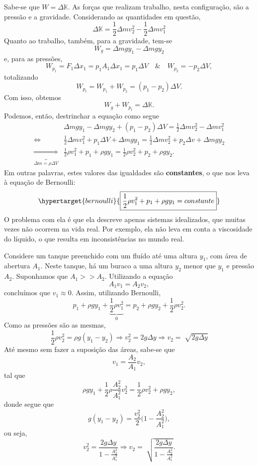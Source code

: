 \documentclass[PhysicsII/physicsII_notes.tex]{subfiles}
\begin{document}
Sabe-se que \(W = \Delta \mathbb{K}\). As forças que realizam trabalho, nesta configuração, são a pressão e a gravidade. Considerando as quantidades em questão,
\[
	\Delta \mathbb{K} = \frac{1}{2}\Delta m v_{2}^{2} - \frac{1}{2}\Delta m v_{1}^{2}
\]
Quanto ao trabalho, também, para a gravidade, tem-se
\[
	W_{g} = \Delta mgy_{1} - \Delta mgy_{2}
\]
e, para as pressões,
\[
	W_{p_{1}} = F_{1}\Delta x_{1} = p_{1}A_{1}\Delta x_{1} = p_{1}\Delta V\quad\&\quad W_{p_{2}} = -p_{2}\Delta V,
\]
totalizando
\[
	W_{p_{t}} = W_{p_{1}} + W_{p_{2}} = (p_{1}-p_{2})\Delta V.
\]
Com isso, obtemos
\[
	W_{g}+W_{p_{t}} = \Delta \mathbb{K}.
\]
Podemos, então, destrinchar a equação como segue
\begin{align*}
	                                                      & \Delta mgy_{1}-\Delta mgy_{2} + (p_{1}-p_{2})\Delta V = \frac{1}{2}\Delta mv_{2}^{2}-\Delta mv_{1}^{2}                        \\
	\Longleftrightarrow\quad                              & \frac{1}{2}\Delta mv_{1}^{2} + p_{1}\Delta V + \Delta mgy_{1} = \frac{1}{2}\Delta mv_{2}^{2} + p_{2}\Delta v + \Delta mgy_{2} \\
	\underbrace{\Longrightarrow}_{\Delta m=\rho \Delta V} & \frac{1}{2}\rho v_{1}^{2} + p_{1} + \rho gy_{1} = \frac{1}{2}\rho v_{2}^{2} + p_{2} + \rho gy_{2}.
\end{align*}
Em outras palavras, estes valores das igualdades são \textbf{constantes}, o que nos leva à equação de Bernoulli:
\[
	\hypertarget{bernoulli}{\boxed{\frac{1}{2}\rho v_{1}^{2}+p_{1}+\rho gy_{1}=constante}}
\]
O problema com ela é que ela descreve apenas sistemas idealizados, que muitas vezes não ocorrem na vida real. Por exemplo,
ela não leva em conta a viscosidade do líquido, o que resulta em inconsistências no mundo real.
\begin{example}
	Considere um tanque preenchido com um fluído até uma altura \(y_{1}\), com área de abertura \(A_{1}\). Neste tanque, há um buraco
	a uma altura \(y_{2}\) menor que \(y_{1}\) e pressão \(A_{2}\). Suponhamos que \(A_{1}>> A_{2}\). Utilizando a equação
	\[
		A_{1}v_{1} = A_{2}v_{2},
	\]
	concluímos que \(v_{1}\approx0\). Assim, utilizando Bernoulli,
	\[
		p_{1} + \rho gy_{1} + \underbrace{\frac{1}{2}\rho v_{1}^{2}}_{0} = p_{2} + \rho gy_{2} + \frac{1}{2}\rho v_{2}^{2}.
	\]
	Como as pressões são as mesmas,
	\[
		\frac{1}{2}\rho v_{2}^{2} = \rho g(y_{1}-y_{2}) \Rightarrow v_{2}^{2} = 2g\Delta y \Rightarrow v_{2}=\sqrt[]{2g\Delta y}
	\]
	Até mesmo sem fazer a suposição das áreas, sabe-se que
	\[
		v_{1} = \frac{A_{2}}{A_{1}}v_{2},
	\]
	tal que
	\[
		\rho gy_{1} + \frac{1}{2}\rho \frac{A_{2}^{2}}{A_{1}^{2}}v_{2}^{2} = \frac{1}{2}\rho v_{2}^{2} + \rho gy_{2},
	\]
	donde segue que
	\[
		g(y_{1}-y_{2}) = \frac{v_{2}^{2}}{2}\biggl(1-\frac{A_{2}^{2}}{A_{1}^{2}}\biggr),
	\]
	ou seja,
	\[
		v_{2}^{2} = \frac{2g\Delta y}{1-\frac{A_{2}^{2}}{A_{1}^{2}}} \Rightarrow v_{2} = \sqrt[]{\frac{2g\Delta y}{1-\frac{A_{2}^{2}}{A_{1}^{2}}}}.
	\]
\end{example}
\end{document}
